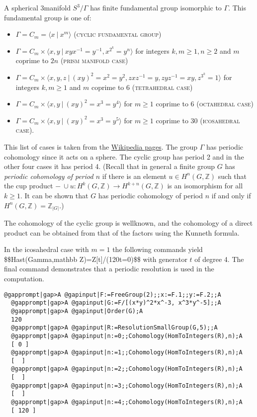 \documentclass[a4paper,11pt]{report}
\begin{document}
{{ A spherical 3\texttt{}manifold $S^3/\Gamma$ has finite fundamental group isomorphic to $\Gamma$. This fundamental group is one of: 
\begin{itemize}
\item  $\Gamma=C_m=\langle x\ |\ x^m\rangle$ (\textsc{cyclic fundamental group})
\item  $\Gamma=C_m\times \langle x,y \ |\ xyx^{-1}=y^{-1}, x^{2^k}=y^n \rangle$ for integers $k, m\ge 1, n\ge 2$ and $m$ coprime to $2n$ (\textsc{prism manifold case})
\item  $\Gamma= C_m\times \langle x,y, z \ |\ (xy)^2=x^2=y^2, zxz^{-1}=y, zyz^{-1}=xy,
z^{3^k}=1\rangle $ for integers $k,m\ge 1$ and $m$ coprime to 6 (\textsc{tetrahedral case})
\item  $\Gamma=C_m\times\langle x,y\ |\ (xy)^2=x^3=y^4\rangle $ for $m\ge 1$ coprime to 6 (\textsc{octahedral case})
\item $\Gamma=C_m\times \langle x,y\ |\ (xy)^2=x^3=y^5\rangle $ for $m\ge 1$ coprime to 30 (\textsc{icosahedral case}).
\end{itemize}
 This list of cases is taken from the \href{https://en.wikipedia.org/wiki/Spherical_3-manifold} {Wikipedia pages}. The group $\Gamma$ has periodic cohomology since it acts on a sphere. The cyclic group has period
2 and in the other four cases it has period 4. (Recall that in general a
finite group $G$ has \emph{periodic cohomology of period $n$} if there is an element $u\in H^n(G,\mathbb Z)$ such that the cup product $-\ \cup u\colon H^k(G,\mathbb Z) \rightarrow H^{k+n}(G,\mathbb Z)$ is an isomorphism for all $k\ge 1$. It can be shown that $G$ has periodic cohomology of period $n$ if and only if $H^{n}(G,\mathbb Z)=\mathbb Z_{|G|}$.) 

The cohomology of the cyclic group is well\texttt{}known, and the
cohomology of a direct product can be obtained from that of the factors using
the Kunneth formula. 

 In the icosahedral case with $m=1$ the following commands yield
\$\$H\texttt{}\texttt{}ast(\texttt{}Gamma,\texttt{}mathbb
Z)=Z[t]/(120t=0)\$\$ with generator $t$ of degree 4. The final command demonstrates that a periodic resolution is used
in the computation. 
\begin{Verbatim}[commandchars=@|A,fontsize=\small,frame=single,label=Example]
  @gapprompt|gap>A @gapinput|F:=FreeGroup(2);;x:=F.1;;y:=F.2;;A
  @gapprompt|gap>A @gapinput|G:=F/[(x*y)^2*x^-3, x^3*y^-5];;A
  @gapprompt|gap>A @gapinput|Order(G);A
  120
  @gapprompt|gap>A @gapinput|R:=ResolutionSmallGroup(G,5);;A
  @gapprompt|gap>A @gapinput|n:=0;;Cohomology(HomToIntegers(R),n);A
  [ 0 ]
  @gapprompt|gap>A @gapinput|n:=1;;Cohomology(HomToIntegers(R),n);A
  [  ]
  @gapprompt|gap>A @gapinput|n:=2;;Cohomology(HomToIntegers(R),n);A
  [  ]
  @gapprompt|gap>A @gapinput|n:=3;;Cohomology(HomToIntegers(R),n);A
  [  ]
  @gapprompt|gap>A @gapinput|n:=4;;Cohomology(HomToIntegers(R),n);A
  [ 120 ]
  

\end{Verbatim}}}
\end{document}
